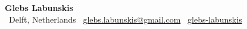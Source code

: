 \documentclass[a4paper,11pt]{article}
\begin{document}
\begin{center}
    {\Huge \textbf{Glebs Labunskis}}\\[4pt]
    \faMapMarker*~Delft, Netherlands \quad
    \faEnvelope~\href{mailto:glebs.labunskis@gmail.com}{glebs.labunskis@gmail.com} \quad
    \faLinkedin~\href{https://www.linkedin.com/in/glebs-labunskis/}{glebs-labunskis}
\end{center}








\end{document}
